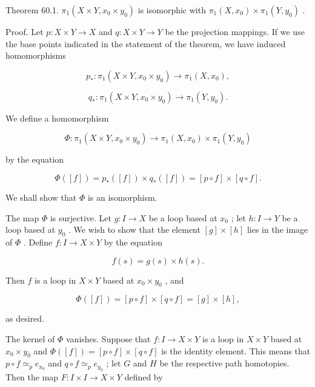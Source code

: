 Theorem 60.1. \({\pi }_{1}\left( {X \times  Y,{x}_{0} \times  {y}_{0}}\right)\) is isomorphic with \({\pi }_{1}\left( {X,{x}_{0}}\right)  \times  {\pi }_{1}\left( {Y,{y}_{0}}\right)\) .

Proof. Let \(p : X \times  Y \rightarrow  X\) and \(q : X \times  Y \rightarrow  Y\) be the projection mappings. If we use the base points indicated in the statement of the theorem, we have induced homomorphisms

\[
{p}_{ * } : {\pi }_{1}\left( {X \times  Y,{x}_{0} \times  {y}_{0}}\right)  \rightarrow  {\pi }_{1}\left( {X,{x}_{0}}\right) ,
\]

\[
{q}_{ * } : {\pi }_{1}\left( {X \times  Y,{x}_{0} \times  {y}_{0}}\right)  \rightarrow  {\pi }_{1}\left( {Y,{y}_{0}}\right) .
\]

We define a homomorphism

\[
\Phi  : {\pi }_{1}\left( {X \times  Y,{x}_{0} \times  {y}_{0}}\right)  \rightarrow  {\pi }_{1}\left( {X,{x}_{0}}\right)  \times  {\pi }_{1}\left( {Y,{y}_{0}}\right)
\]

by the equation

\[
\Phi \left( \left\lbrack  f\right\rbrack  \right)  = {p}_{ * }\left( \left\lbrack  f\right\rbrack  \right)  \times  {q}_{ * }\left( \left\lbrack  f\right\rbrack  \right)  = \left\lbrack  {p \circ  f}\right\rbrack   \times  \left\lbrack  {q \circ  f}\right\rbrack  .
\]

We shall show that \(\Phi\) is an isomorphism.

The map \(\Phi\) is surjective. Let \(g : I \rightarrow  X\) be a loop based at \({x}_{0}\) ; let \(h : I \rightarrow  Y\) be a loop based at \({y}_{0}\) . We wish to show that the element \(\left\lbrack  g\right\rbrack   \times  \left\lbrack  h\right\rbrack\) lies in the image of \(\Phi\) . Define \(f : I \rightarrow  X \times  Y\) by the equation

\[
f\left( s\right)  = g\left( s\right)  \times  h\left( s\right) .
\]

Then \(f\) is a loop in \(X \times  Y\) based at \({x}_{0} \times  {y}_{0}\) , and

\[
\Phi \left( \left\lbrack  f\right\rbrack  \right)  = \left\lbrack  {p \circ  f}\right\rbrack   \times  \left\lbrack  {q \circ  f}\right\rbrack   = \left\lbrack  g\right\rbrack   \times  \left\lbrack  h\right\rbrack  ,
\]

as desired.

The kernel of \(\Phi\) vanishes. Suppose that \(f : I \rightarrow  X \times  Y\) is a loop in \(X \times  Y\) based at \({x}_{0} \times  {y}_{0}\) and \(\Phi \left( \left\lbrack  f\right\rbrack  \right)  = \left\lbrack  {p \circ  f}\right\rbrack   \times  \left\lbrack  {q \circ  f}\right\rbrack\) is the identity element. This means that \(p \circ  f{ \simeq  }_{p}{e}_{{x}_{0}}\) and \(q \circ  f{ \simeq  }_{p}{e}_{{y}_{0}}\) ; let \(G\) and \(H\) be the respective path homotopies. Then the map \(F : I \times  I \rightarrow  X \times  Y\) defined by

